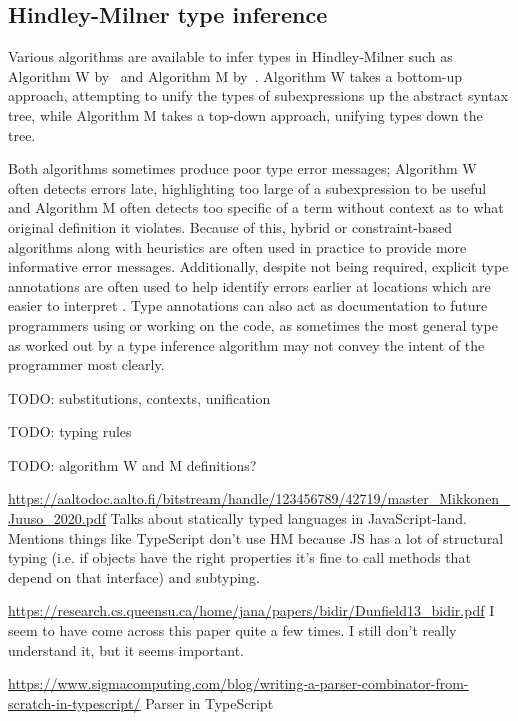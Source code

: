 \documentclass[a4paper,fleqn,12pt]{article}
\begin{document}
\subsection{Hindley-Milner type inference}\label{id:h.admfqf7bhkct}
Various algorithms are available to infer types in Hindley-Milner such as Algorithm W by~\cite{ref21} and Algorithm M by~\cite{ref22}. Algorithm W takes a bottom-up approach, attempting to unify the types of subexpressions up the abstract syntax tree, while Algorithm M takes a top-down approach, unifying types down the tree.

Both algorithms sometimes produce poor type error messages; Algorithm W often detects errors late, highlighting too large of a subexpression to be useful and Algorithm M often detects too specific of a term without context as to what original definition it violates. Because of this, hybrid or constraint-based algorithms along with heuristics are often used in practice to provide more informative error messages. Additionally, despite not being required, explicit type annotations are often used to help identify errors earlier at locations which are easier to interpret \citep{ref23}. Type annotations can also act as documentation to future programmers using or working on the code, as sometimes the most general type as worked out by a type inference algorithm may not convey the intent of the programmer most clearly.

TODO: substitutions, contexts, unification

TODO: typing rules

TODO: algorithm W and M definitions?

\underline{\href{https://aaltodoc.aalto.fi/bitstream/handle/123456789/42719/master\_Mikkonen\_Juuso\_2020.pdf}{https://aaltodoc.aalto.fi/bitstream/handle/123456789/42719/master\_Mikkonen\_Juuso\_2020.pdf}}
Talks about statically typed languages in JavaScript-land. Mentions things like TypeScript don’t use HM because JS has a lot of structural typing (i.e. if objects have the right properties it’s fine to call methods that depend on that interface) and subtyping.

\underline{\href{https://research.cs.queensu.ca/home/jana/papers/bidir/Dunfield13\_bidir.pdf}{https://research.cs.queensu.ca/home/jana/papers/bidir/Dunfield13\_bidir.pdf}}
I seem to have come across this paper quite a few times. I still don’t really understand it, but it seems important.

\underline{\href{https://www.sigmacomputing.com/blog/writing-a-parser-combinator-from-scratch-in-typescript/}{https://www.sigmacomputing.com/blog/writing-a-parser-combinator-from-scratch-in-typescript/}}
Parser in TypeScript
\end{document}
